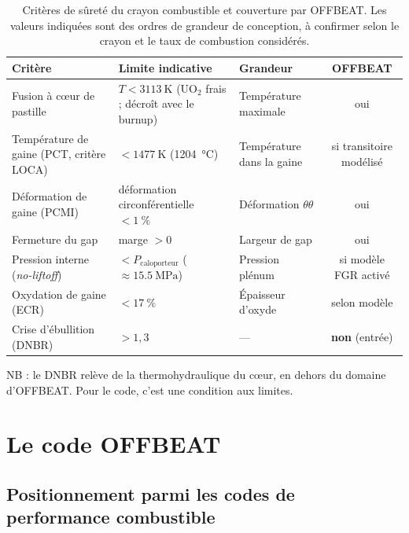 \documentclass[12pt,a4paper,french]{report}
\begin{document}
\begin{table}[htbp]
\centering
\caption[Critères de sûreté et couverture par OFFBEAT]{Critères de sûreté du crayon combustible et couverture par OFFBEAT.
Les valeurs indiquées sont des ordres de grandeur de conception, à confirmer
selon le crayon et le taux de combustion considérés.}
\label{tab:criteres}
\small
\begin{tabularx}{\textwidth}{@{}>{\raggedright\arraybackslash}p{4.1cm}
                                >{\raggedright\arraybackslash}p{3.9cm}
                                X
                                c@{}}
\toprule
\textbf{Critère} & \textbf{Limite indicative} & \textbf{Grandeur} &
\textbf{OFFBEAT}\\
\midrule
Fusion à c\oe ur de pastille & $T < \SI{3113}{\kelvin}$ ($\mathrm{UO_2}$
  frais ; décroît avec le burnup) & Température maximale & oui\\
Température de gaine (PCT, critère LOCA) & $< \SI{1477}{\kelvin}$
  (\SI{1204}{\celsius}) & Température dans la gaine & si transitoire modélisé\\
Déformation de gaine (PCMI) & déformation circonférentielle
  $< \SI{1}{\percent}$ & Déformation $\theta\theta$ & oui\\
Fermeture du gap & marge $>0$ & Largeur de gap & oui\\
Pression interne (\textit{no-liftoff}) & $< P_{\text{caloporteur}}$
  ($\approx\SI{15.5}{\mega\pascal}$) & Pression plénum & si modèle FGR activé\\
Oxydation de gaine (ECR) & $< \SI{17}{\percent}$ & Épaisseur d'oxyde &
  selon modèle\\
Crise d'ébullition (DNBR) & $> 1{,}3$ & --- & \textbf{non} (entrée)\\
\bottomrule
\end{tabularx}
\end{table}

NB : le DNBR relève de la thermohydraulique du
c\oe ur, en dehors du domaine d'OFFBEAT. Pour le code, c'est une condition aux limites.

\section{Le code OFFBEAT}

\subsection{Positionnement parmi les codes de performance combustible}
\end{document}

